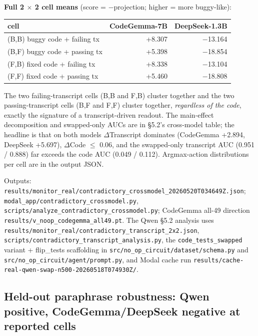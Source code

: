 \documentclass[
  11pt,
  a4paper]{article}
\newcounter{none} %
\begin{document}
\textbf{Full 2 \ensuremath{\times} 2 cell means} (score = \ensuremath{-}projection; higher = more
buggy-like):

{\def\LTcaptype{none} %
\begin{longtable}[]{@{}lrr@{}}
\toprule\noalign{}
cell & CodeGemma-7B & DeepSeek-1.3B \\
\midrule\noalign{}
\endhead
\bottomrule\noalign{}
\endlastfoot
(B,B) buggy code + failing tx & +8.307 & \ensuremath{-}13.164 \\
(B,F) buggy code + passing tx & +5.398 & \ensuremath{-}18.854 \\
(F,B) fixed code + failing tx & +8.338 & \ensuremath{-}13.104 \\
(F,F) fixed code + passing tx & +5.460 & \ensuremath{-}18.808 \\
\end{longtable}
}

The two failing-transcript cells (B,B and F,B) cluster together and the
two passing-transcript cells (B,F and F,F) cluster together,
\emph{regardless of the code}, exactly the signature of a
transcript-driven readout. The main-effect decomposition and
swapped-only AUCs are in \S{}5.2's cross-model table; the headline is that
on both models \ensuremath{\Delta}Transcript dominates (CodeGemma +2.894, DeepSeek
+5.697), \textbar \ensuremath{\Delta}Code\textbar{} \ensuremath{\leq} 0.06, and the swapped-only
transcript AUC (0.951 / 0.888) far exceeds the code AUC (0.049 / 0.112).
Argmax-action distributions per cell are in the output JSON.

Outputs:
\texttt{results/monitor\_real/contradictory\_crossmodel\_20260520T034649Z.json};
\texttt{modal\_app/contradictory\_crossmodel.py},
\texttt{scripts/analyze\_contradictory\_crossmodel.py}; CodeGemma all-49
direction \texttt{results/v\_noop\_codegemma\_all49.pt}. The Qwen \S{}5.2
analysis uses
\texttt{results/monitor\_real/contradictory\_transcript\_2x2.json},
\texttt{scripts/contradictory\_transcript\_analysis.py}, the
\texttt{code\_tests\_swapped} variant + flip\_tests scaffolding in
\texttt{src/no\_op\_circuit/dataset/schema.py} and
\texttt{src/no\_op\_circuit/agent/prompt.py}, and Modal cache run
\texttt{results/cache-real-qwen-swap-n500-20260518T074930Z/}.

\subsection{Held-out paraphrase robustness: Qwen positive,
CodeGemma/DeepSeek negative at reported
cells}\label{held-out-paraphrase-robustness-qwen-positive-codegemmadeepseek-negative-at-reported-cells}
\end{document}

